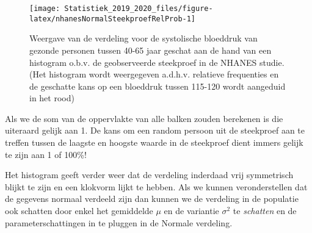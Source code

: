 \documentclass[12pt,dutch,coursenotes]{book}
\newenvironment{Shaded}{\begin{snugshade}}{\end{snugshade}}
\newcommand{\KeywordTok}[1]{\textcolor[rgb]{0.13,0.29,0.53}{\textbf{#1}}}
\newcommand{\DataTypeTok}[1]{\textcolor[rgb]{0.13,0.29,0.53}{#1}}
\newcommand{\DecValTok}[1]{\textcolor[rgb]{0.00,0.00,0.81}{#1}}
\newcommand{\FloatTok}[1]{\textcolor[rgb]{0.00,0.00,0.81}{#1}}
\newcommand{\StringTok}[1]{\textcolor[rgb]{0.31,0.60,0.02}{#1}}
\newcommand{\OtherTok}[1]{\textcolor[rgb]{0.56,0.35,0.01}{#1}}
\newcommand{\OperatorTok}[1]{\textcolor[rgb]{0.81,0.36,0.00}{\textbf{#1}}}
\newcommand{\NormalTok}[1]{#1}
\theoremstyle{definition}
\theoremstyle{definition}
\theoremstyle{definition}
\theoremstyle{remark}
\begin{document}
\begin{figure}

{\centering \texttt{[image: Statistiek\_2019\_2020\_files/figure-latex/nhanesNormalSteekproefRelProb-1]} 

}

\caption{Weergave van de verdeling voor de systolische bloeddruk van gezonde personen tussen 40-65 jaar geschat aan de hand van een histogram o.b.v. de geobserveerde steekproef in de NHANES studie. (Het histogram wordt weergegeven a.d.h.v. relatieve frequenties en de geschatte kans op een bloeddruk tussen 115-120 wordt aangeduid in het rood)}\label{fig:nhanesNormalSteekproefRelProb}
\end{figure}

Als we de som van de oppervlakte van alle balken zouden berekenen is die
uiteraard gelijk aan 1. De kans om een random persoon uit de steekproef
aan te treffen tussen de laagste en hoogste waarde in de steekproef
dient immers gelijk te zijn aan 1 of 100\%!

Het histogram geeft verder weer dat de verdeling inderdaad vrij
symmetrisch blijkt te zijn en een klokvorm lijkt te hebben. Als we
kunnen veronderstellen dat de gegevens normaal verdeeld zijn dan kunnen
we de verdeling in de populatie ook schatten door enkel het gemiddelde
\(\mu\) en de variantie \(\sigma^2\) te \emph{schatten} en de
parameterschattingen in te pluggen in de Normale verdeling.

\begin{Shaded}
\end{Shaded}
\end{document}
